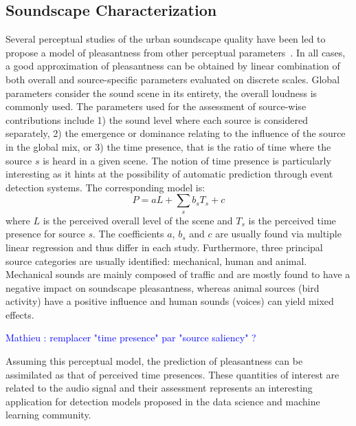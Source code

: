 \documentclass{article}
\newcommand{\ml}[1]{\textcolor{blue}{ Mathieu : #1}}
\begin{document}
\begin{sloppy}
\section{Soundscape Characterization}
\label{sec:char}
Several perceptual studies of the urban soundscape quality have been led to propose a model of pleasantness from other perceptual parameters~\cite{nilsson2007, axelsson2010, aumond2017, ricciardi2014}. In all cases, a good approximation of pleasantness can be obtained by linear combination of both overall and source-specific parameters evaluated on discrete scales. Global parameters consider the sound scene in its entirety, the overall loudness is commonly used. The parameters used for the assessment of source-wise contributions include 1) the sound level where each source is considered separately, 2) the emergence or dominance relating to the influence of the source in the global mix, or 3) the time presence, that is the ratio of time where the source $s$ is heard in a given scene. The notion of time presence is particularly interesting as it hints at the possibility of automatic prediction through event detection systems. The corresponding model is:
\begin{equation}
P = aL + \sum_s b_sT_s + c
\end{equation}
where $L$ is the perceived overall level of the scene and $T_s$ is the perceived time presence for source $s$. The coefficients $a$, $b_s$ and $c$ are usually found via multiple linear regression and thus differ in each study.
Furthermore, three principal source categories are usually identified: mechanical, human and animal. Mechanical sounds are mainly composed of traffic and are mostly found to have a negative impact on soundscape pleasantness, whereas animal sources (bird activity) have a positive influence and human sounds (voices) can yield mixed effects.

\ml{remplacer "time presence" par "source saliency" ?}

Assuming this perceptual model, the prediction of pleasantness can be assimilated as that of perceived time presences. These quantities of interest are related to the audio signal and their assessment represents an interesting application for detection models proposed in the data science and machine learning community.


\end{sloppy}
\end{document}
